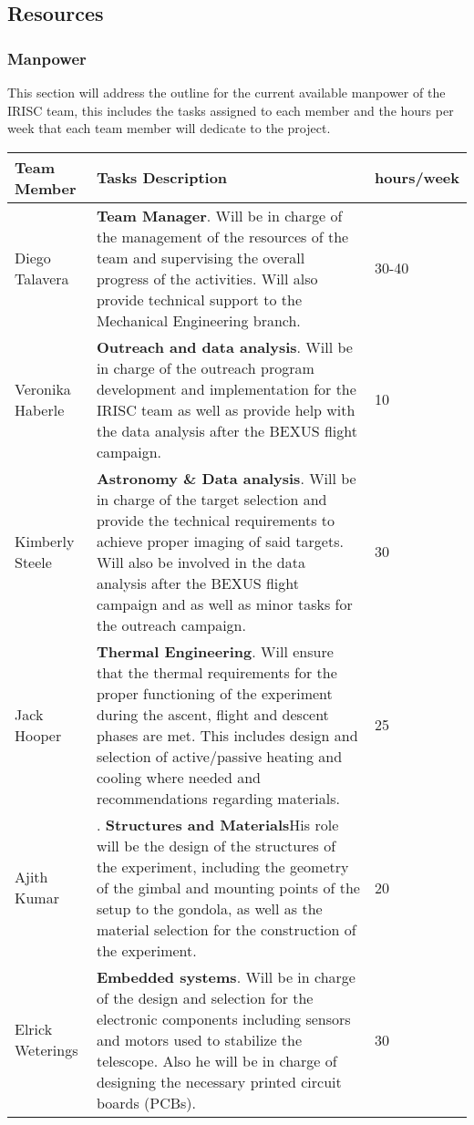 \subsection{Resources}

\subsubsection{Manpower}

This section will address the outline for the current available manpower of the IRISC team, this includes the tasks assigned to each member and the hours per week that each team member will dedicate to the project.

\begin{longtable}{m{} | m{} | m{}}
	\textbf{Team Member} & \textbf{Tasks Description} & \textbf{hours/week} \\ \hline
	Diego Talavera  & \textbf{Team Manager}. Will be in charge of the management of the resources of the team and supervising the overall progress of the activities. Will also provide technical support to the Mechanical Engineering branch. &  30-40 \\ \hline
	Veronika Haberle & \textbf{Outreach and data analysis}. Will be in charge of the outreach program development and implementation for the IRISC team as well as provide help with the data analysis after the BEXUS flight campaign. & 10 \\ \hline
	Kimberly Steele & \textbf{Astronomy \& Data analysis}. Will be in charge of the target selection and provide the technical requirements to achieve proper imaging of said targets. Will also be involved in the data analysis after the BEXUS flight campaign and as well as minor tasks for the outreach campaign. & 30 \\ \hline
	Jack Hooper & \textbf{Thermal Engineering}. Will ensure that the thermal requirements for the proper functioning of the experiment during the ascent, flight and descent phases are met. This includes design and selection of active/passive heating and cooling where needed and recommendations regarding materials. & 25 \\ \hline
	Ajith Kumar & . \textbf{Structures and Materials}His role will be the design of the structures of the experiment, including the geometry of the gimbal and mounting points of the setup to the gondola, as well as the material selection for the construction of the experiment. & 20 \\ \hline
	Elrick Weterings & \textbf{Embedded systems}. Will be in charge of the design and selection for the electronic components including sensors and motors used to stabilize the telescope. Also he will be in charge of designing the necessary printed circuit boards (PCBs). & 30 \\ \hline

\end{longtable}
